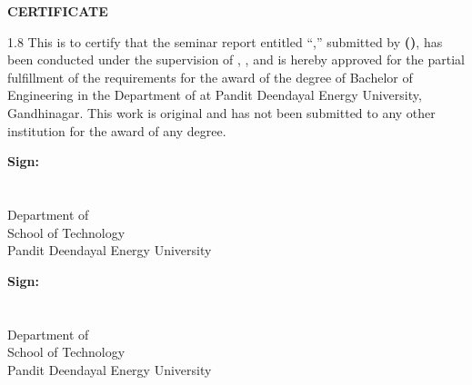 \thispagestyle{empty}

\begin{center}
{\Large \textbf{CERTIFICATE}}
\end{center}

\vspace{1.5cm}

\begin{spacing}{1.8}
\noindent
This is to certify that the seminar report entitled ``\projecttitle,'' submitted by \textbf{\studentname{} (\rollnumber)}, has been conducted under the supervision of \textbf{\guidename}, \textbf{\guidedesignation}, and is hereby approved for the partial fulfillment of the requirements for the award of the degree of Bachelor of Engineering in the Department of \department{} at Pandit Deendayal Energy University, Gandhinagar. This work is original and has not been submitted to any other institution for the award of any degree.
\end{spacing}

\vspace{3cm}

\noindent
\begin{minipage}[t]{0.45\textwidth}
\textbf{Sign:} \hrulefill \\[0.5cm]
\textbf{\guidename} \\
\guidedesignation \\
Department of \department \\
School of Technology \\
Pandit Deendayal Energy University
\end{minipage}
\hfill
\begin{minipage}[t]{0.45\textwidth}
\textbf{Sign:} \hrulefill \\[0.5cm]
\textbf{\examinername} \\
\examinerdesignation \\
Department of \department \\
School of Technology \\
Pandit Deendayal Energy University
\end{minipage}
